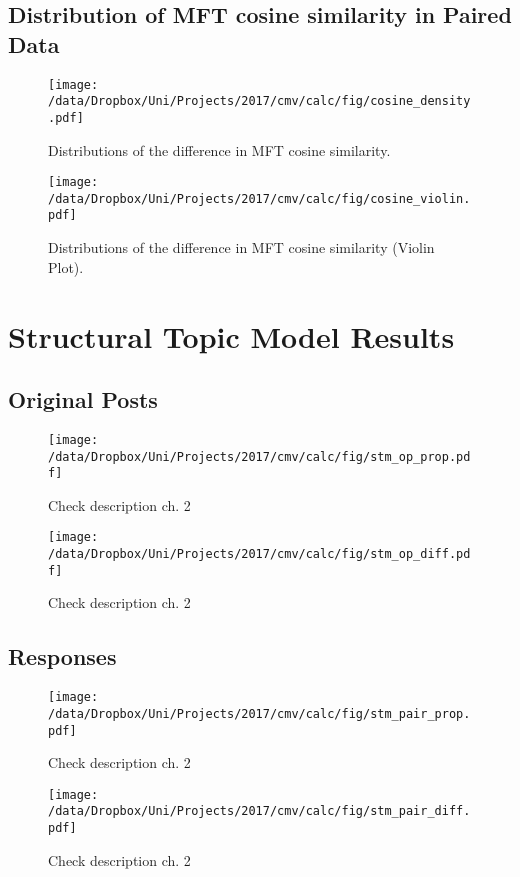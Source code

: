 \clearpage
\subsection{Distribution of MFT cosine similarity in Paired Data}

\begin{figure}[h]
\centering
\texttt{[image: /data/Dropbox/Uni/Projects/2017/cmv/calc/fig/cosine\_density.pdf]}
\caption{Distributions of the difference in MFT cosine similarity.}
\end{figure}


\begin{figure}[h]
\centering
\texttt{[image: /data/Dropbox/Uni/Projects/2017/cmv/calc/fig/cosine\_violin.pdf]}
\caption{Distributions of the difference in MFT cosine similarity (Violin Plot).}
\end{figure}

\clearpage
\section{Structural Topic Model Results}
\renewcommand\thefigure{B.\arabic{figure}}
\renewcommand\thetable{B.\arabic{table}}
\setcounter{figure}{0}
\setcounter{table}{0}

\subsection{Original Posts}

\begin{figure}[h]
\centering
\texttt{[image: /data/Dropbox/Uni/Projects/2017/cmv/calc/fig/stm\_op\_prop.pdf]}
\caption{Check description ch. 2}
\end{figure}

\begin{figure}[h]
\centering
\texttt{[image: /data/Dropbox/Uni/Projects/2017/cmv/calc/fig/stm\_op\_diff.pdf]}
\caption{Check description ch. 2}
\end{figure}

\clearpage
\subsection{Responses}

\begin{figure}[h]
\centering
\texttt{[image: /data/Dropbox/Uni/Projects/2017/cmv/calc/fig/stm\_pair\_prop.pdf]}
\caption{Check description ch. 2}
\end{figure}

\begin{figure}[h]
\centering
\texttt{[image: /data/Dropbox/Uni/Projects/2017/cmv/calc/fig/stm\_pair\_diff.pdf]}
\caption{Check description ch. 2}
\end{figure}

